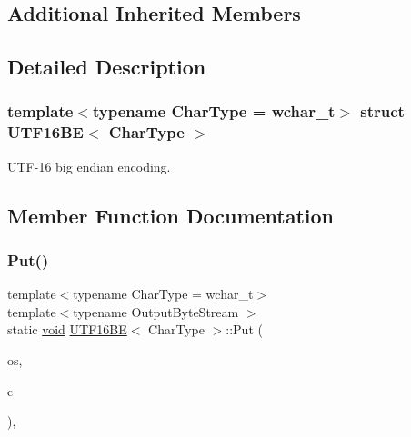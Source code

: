 \subsection*{Additional Inherited Members}


\subsection{Detailed Description}
\subsubsection*{template$<$typename Char\+Type = wchar\+\_\+t$>$\newline
struct U\+T\+F16\+B\+E$<$ Char\+Type $>$}

U\+T\+F-\/16 big endian encoding. 

\subsection{Member Function Documentation}
\mbox{\label{structUTF16BE_ab0f964c3ec9ac6cc47f2875ae112dbfe}} 
\subsubsection{\texorpdfstring{Put()}{Put()}}
{\footnotesize\ttfamily template$<$typename Char\+Type  = wchar\+\_\+t$>$ \\
template$<$typename Output\+Byte\+Stream $>$ \\
static \hyperlink{imgui__impl__opengl3__loader_8h_ac668e7cffd9e2e9cfee428b9b2f34fa7}{void} \hyperlink{structUTF16BE}{U\+T\+F16\+BE}$<$ Char\+Type $>$\+::Put (\begin{DoxyParamCaption}\item[{Output\+Byte\+Stream \&}]{os,  }\item[{Char\+Type}]{c }\end{DoxyParamCaption})\hspace{0.3cm}{\ttfamily [inline]}, {\ttfamily [static]}}

\mbox{\label{structUTF16BE_ae109dda1ad7955049589885ea5a13652}} 
